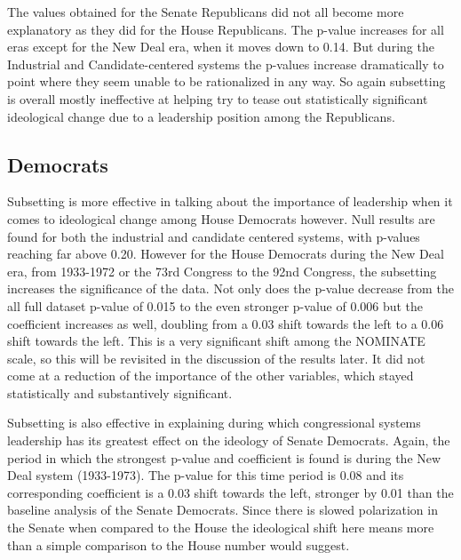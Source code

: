 \documentclass[12pt,twoside]{reedthesis}
\begin{document}
  The values obtained for the Senate Republicans did not all become more
  explanatory as they did for the House Republicans. The p-value increases
  for all eras except for the New Deal era, when it moves down to 0.14.
  But during the Industrial and Candidate-centered systems the p-values
  increase dramatically to point where they seem unable to be rationalized
  in any way. So again subsetting is overall mostly ineffective at helping
  try to tease out statistically significant ideological change due to a
  leadership position among the Republicans.
  
  \subsection{Democrats}\label{democrats-1}
  
  Subsetting is more effective in talking about the importance of
  leadership when it comes to ideological change among House Democrats
  however. Null results are found for both the industrial and candidate
  centered systems, with p-values reaching far above 0.20. However for the
  House Democrats during the New Deal era, from 1933-1972 or the 73rd
  Congress to the 92nd Congress, the subsetting increases the significance
  of the data. Not only does the p-value decrease from the all full
  dataset p-value of 0.015 to the even stronger p-value of 0.006 but the
  coefficient increases as well, doubling from a 0.03 shift towards the
  left to a 0.06 shift towards the left. This is a very significant shift
  among the NOMINATE scale, so this will be revisited in the discussion of
  the results later. It did not come at a reduction of the importance of
  the other variables, which stayed statistically and substantively
  significant.
  
  Subsetting is also effective in explaining during which congressional
  systems leadership has its greatest effect on the ideology of Senate
  Democrats. Again, the period in which the strongest p-value and
  coefficient is found is during the New Deal system (1933-1973). The
  p-value for this time period is 0.08 and its corresponding coefficient
  is a 0.03 shift towards the left, stronger by 0.01 than the baseline
  analysis of the Senate Democrats. Since there is slowed polarization in
  the Senate when compared to the House the ideological shift here means
  more than a simple comparison to the House number would suggest.
  
\end{document}
